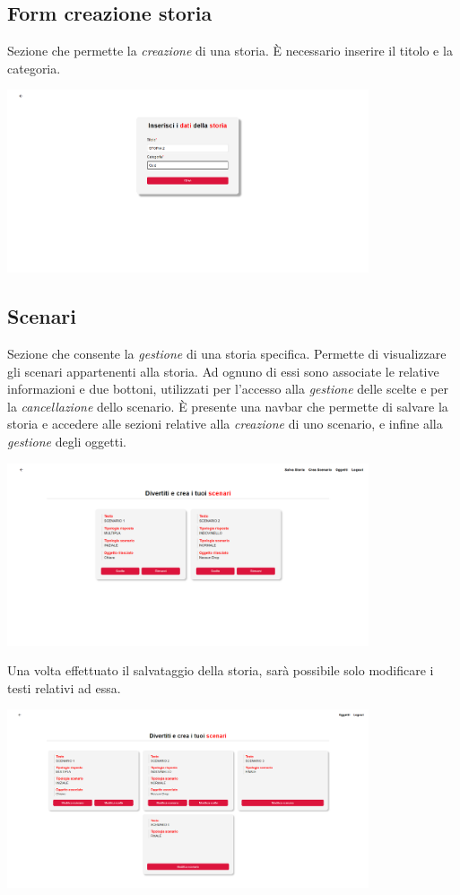 \documentclass{article}
\begin{document}
\subsection*{Form creazione storia}
Sezione che permette la \textit{creazione} di una storia. È necessario inserire il titolo e la categoria.
\begin{center}
    \includegraphics[width=0.8\textwidth]{foto10.png}
\end{center}

\subsection*{Scenari}
Sezione che consente la \textit{gestione} di una storia specifica. Permette di visualizzare gli scenari appartenenti alla storia. Ad ognuno di essi sono associate le relative informazioni e due bottoni, utilizzati per l'accesso alla \textit{gestione} delle scelte e per la \textit{cancellazione} dello scenario. È presente una navbar che permette di salvare la storia e accedere alle sezioni relative alla \textit{creazione} di uno scenario, e infine alla \textit{gestione} degli oggetti.
\begin{center}
    \includegraphics[width=0.8\textwidth]{foto11.png}
\end{center}
Una volta effettuato il salvataggio della storia, sarà possibile solo modificare i testi relativi ad essa.
\begin{center}
    \includegraphics[width=0.8\textwidth]{foto12.png}
\end{center}
\end{document}
